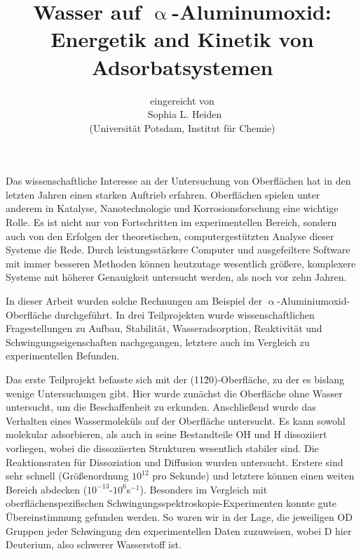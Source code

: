 \documentclass[11pt,DIV=13,a4paper,headinclude,german]{scrartcl}
\begin{document}
\titlehead{\centering\normalfont\large\scshape Allgemeinverständliche Zusammenfassung}
\title{\Large\vspace{-\baselineskip} Wasser auf $\upalpha$-Aluminumoxid:\\
  Energetik and Kinetik von Adsorbatsystemen \vspace{0\baselineskip}}
\author{\large\sffamily eingereicht von\\
  \Large\textbf\sffamily\ Sophia L. Heiden\\
  \large\sffamily (Universit\"{a}t Potsdam, Institut f\"{u}r Chemie)}
\date{}
\maketitle
\vspace{-1cm}
Das wissenschaftliche Interesse an der Untersuchung von Oberflächen hat in den letzten Jahren einen starken Auftrieb erfahren.
Oberflächen spielen unter anderem in Katalyse, Nanotechnologie und Korrosionsforschung eine wichtige Rolle.
Es ist nicht nur von Fortschritten im experimentellen Bereich, sondern auch von den Erfolgen der theoretischen, computergestützten Analyse dieser Systeme die Rede.
Durch leistungsstärkere Computer und ausgefeiltere Software mit immer besseren Methoden können heutzutage wesentlich größere, komplexere Systeme mit höherer Genauigkeit untersucht werden, als noch vor zehn Jahren.

In dieser Arbeit wurden solche Rechnungen am Beispiel der $\upalpha$-Aluminiumoxid-Oberfläche durchgeführt.
In drei Teilprojekten wurde wissenschaftlichen Fragestellungen zu Aufbau, Stabilität, Wasseradsorption, Reaktivität und Schwingungseigenschaften nachgegangen, letztere auch im Vergleich zu experimentellen Befunden.

Das erste Teilprojekt befasste sich mit der (11\=20)-Oberfläche, zu der es bislang wenige Untersuchungen gibt.
Hier wurde zunächst die Oberfläche ohne Wasser %
untersucht, um die Beschaffenheit zu erkunden.
Anschließend wurde das Verhalten eines Wassermoleküls auf der Oberfläche untersucht.
Es kann sowohl molekular adsorbieren, als auch in seine Bestandteile OH und H dissoziiert vorliegen, wobei die dissoziierten Strukturen wesentlich stabiler sind.
Die Reaktionsraten für Dissoziation und Diffusion wurden untersucht. Erstere sind sehr schnell (Größenordnung $10^{12}$ pro Sekunde) und letztere können einen weiten Bereich abdecken ($10^{-13}$-$10^6$s$^{-1}$).
Besonders im Vergleich mit oberflächenspezifischen Schwin\-gungs\-spek\-tros\-ko\-pie-Experimenten konnte gute Übereinstimmung gefunden werden.
So waren wir in der Lage, die jeweiligen OD Gruppen jeder Schwingung den experimentellen Daten zuzuweisen, wobei D hier Deuterium, also schwerer Wasserstoff ist.
\end{document}

